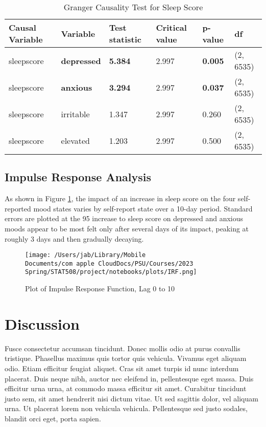 \documentclass{article}
\begin{document}
\begin{table}[hb]
    \centering
    \begin{tabular}{llllll}
    \toprule
        \textbf{Causal Variable} & \textbf{Variable} & \textbf{Test statistic} & \textbf{Critical value} & \textbf{p-value} & \textbf{df} \\
        \midrule
        sleepscore & \textbf{depressed} & \textbf{5.384} & 2.997 & \textbf{0.005} & (2, 6535) \\
        sleepscore & \textbf{anxious} & \textbf{3.294} & 2.997 & \textbf{0.037} & (2, 6535) \\
        sleepscore & irritable & 1.347 & 2.997 & 0.260 & (2, 6535) \\
        sleepscore & elevated & 1.203 & 2.997 & 0.500 & (2, 6535) \\
      \bottomrule
    \end{tabular}
    \caption{Granger Causality Test for Sleep Score}
    \label{Granger}
\end{table}


\hypertarget{impulse-response-analysis-1}{%
\subsection{Impulse Response Analysis}\label{impulse-response-analysis-1}}

As shown in Figure \ref{IRF}, the impact of an increase in sleep score on the
four self-reported mood states varies by self-report state over a 10-day period.
Standard errors are plotted at the 95%
increase to sleep score on depressed and anxious moods appear to be most felt
only after several days of its impact, peaking at roughly 3 days and then
gradually decaying.

\begin{figure}[ht]
\centering
  \texttt{[image: /Users/jab/Library/Mobile Documents/com~apple~CloudDocs/PSU/Courses/2023 Spring/STAT508/project/notebooks/plots/IRF.png]}
  \caption{Plot of Impulse Response Function, Lag 0 to 10}
  \label{IRF}
\end{figure}



\hypertarget{discussion}{%
\section{Discussion}\label{discussion}}

Fusce consectetur accumsan tincidunt. Donec mollis odio at purus
convallis tristique. Phasellus maximus quis tortor quis vehicula.
Vivamus eget aliquam odio. Etiam efficitur feugiat aliquet. Cras sit
amet turpis id nunc interdum placerat. Duis neque nibh, auctor nec
eleifend in, pellentesque eget massa. Duis efficitur urna urna, at
commodo massa efficitur sit amet. Curabitur tincidunt justo sem, sit
amet hendrerit nisi dictum vitae. Ut sed sagittis dolor, vel aliquam
urna. Ut placerat lorem non vehicula vehicula. Pellentesque sed justo
sodales, blandit orci eget, porta sapien.
\end{document}
